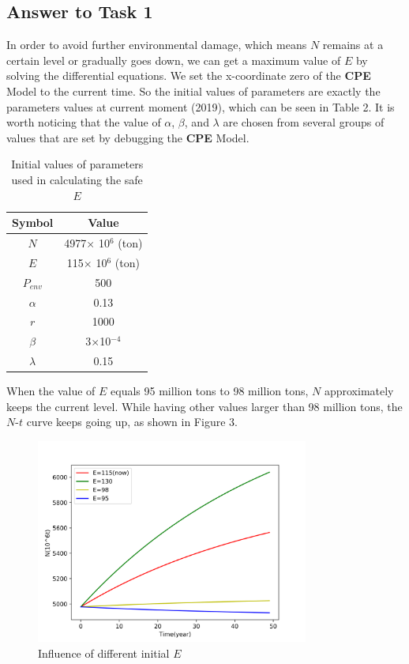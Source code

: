 \documentclass{mcmthesis}
\begin{document}
 \subsection{Answer to Task 1}
	 In order to avoid further environmental damage, which means $N$ remains at a certain level or gradually goes down, we can get a maximum value of $E$ by solving the differential equations. We set the x-coordinate zero of the \textbf{CPE} Model to the current time. So the initial values of parameters are exactly the parameters values at current moment (2019), which can be seen in Table 2. It is worth noticing that the value of $\alpha$, $\beta$, and $\lambda$ are chosen from several groups of values that are set by debugging the \textbf{CPE} Model. %
	 \begin{table}[H]
	  \renewcommand\arraystretch{1.2}
	  \centering
	 \caption{Initial values of parameters used in calculating the safe $E$}
	 \begin{tabular}{|c|c|}%
        \hline
        Symbol&Value\\
        \hline
		$N$&4977$\times$ 10$^6$ (ton)\\
		\hline
        $E$&115$\times$ 10$^6$ (ton)\\
		\hline
		$P_{env}$&500\\
		\hline
		$\alpha$&0.13\\
		\hline
		$r$&1000\\
		\hline
		$\beta$&3$\times$10$^{-4}$\\
		\hline
		$\lambda$&0.15\\
        \hline
        \end{tabular}
    \end{table}
	  
	 When the value of $E$ equals 95 million tons to 98 million tons, $N$ approximately keeps the current level. While having other values larger than 98 million tons, the $N$-$t$ curve keeps going up, as shown in Figure 3.
	 
      \begin{figure}[H]
		\centering
		\includegraphics[width=0.8\textwidth]{figure/Estimation_of_minimal_achievable_level_plastic.png}
		 \caption{Influence of different initial $E$}
	   \end{figure}
\end{document}
